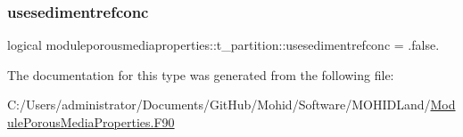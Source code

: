 \mbox{\label{structmoduleporousmediaproperties_1_1t__partition_a9b27c6e69873f30d00ac0b26712139e2}} 
\subsubsection{\texorpdfstring{usesedimentrefconc}{usesedimentrefconc}}
{\footnotesize\ttfamily logical moduleporousmediaproperties\+::t\+\_\+partition\+::usesedimentrefconc = .false.\hspace{0.3cm}{\ttfamily [private]}}



The documentation for this type was generated from the following file\+:\begin{DoxyCompactItemize}
\item 
C\+:/\+Users/administrator/\+Documents/\+Git\+Hub/\+Mohid/\+Software/\+M\+O\+H\+I\+D\+Land/\mbox{\hyperlink{_module_porous_media_properties_8_f90}{Module\+Porous\+Media\+Properties.\+F90}}\end{DoxyCompactItemize}
